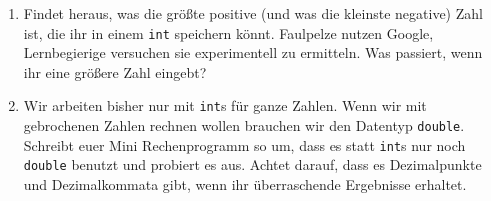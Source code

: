 \begin{spiel}
    \begin{enumerate}
        \item Findet heraus, was die größte positive (und was die kleinste
              negative) Zahl ist, die ihr in einem \texttt{int} speichern könnt.
              Faulpelze nutzen Google, Lernbegierige versuchen sie experimentell zu
              ermitteln. Was passiert, wenn ihr eine größere Zahl eingebt?
        \item Wir arbeiten bisher nur mit \texttt{int}s für ganze Zahlen. Wenn  wir mit gebrochenen Zahlen rechnen wollen brauchen wir den Datentyp
              \texttt{double}. Schreibt euer Mini Rechenprogramm so um, dass es statt
              \texttt{int}s nur noch \texttt{double} benutzt und probiert es aus.
              Achtet darauf, dass es Dezimalpunkte und Dezimalkommata gibt, wenn ihr
              überraschende Ergebnisse erhaltet.
    \end{enumerate}
\end{spiel}
